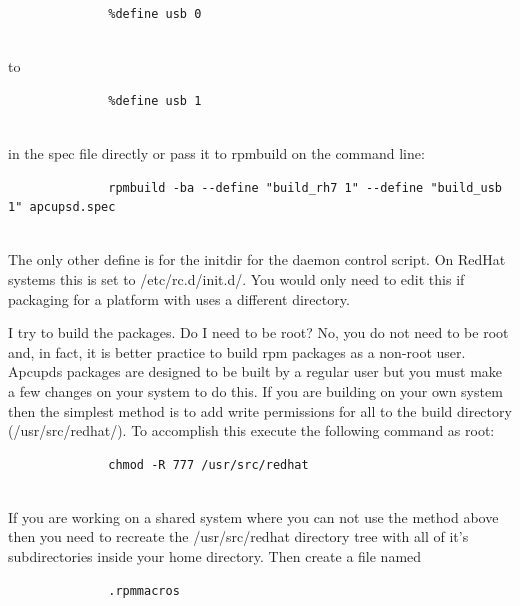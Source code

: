 {{{{{{{{{{{{{{{{{\begin{description}
\footnotesize
\begin{verbatim}
              %define usb 0
     
\end{verbatim}
\normalsize

to  

\footnotesize
\begin{verbatim}
              %define usb 1
     
\end{verbatim}
\normalsize

in the spec file directly or pass it to rpmbuild on the command line:  

\footnotesize
\begin{verbatim}
              rpmbuild -ba --define "build_rh7 1" --define "build_usb 1" apcupsd.spec
     
\end{verbatim}
\normalsize


\item [{\bf other defines are used?}]
   The only other define is for the initdir for the daemon control script. On
RedHat systems this is set to /etc/rc.d/init.d/.  You would only need to edit
this if packaging for a platform with uses a different directory.  

\item [{\bf I'm getting errors about not having permission when}]
   I try to build the packages.  Do I need to be root? No, you do not need to be
root and, in fact, it is better practice to build rpm packages as a non-root
user.  Apcupds packages are designed to be built by a regular user but you
must make a few changes on your system to do this.  If you are building on
your own system then the simplest method is to add write permissions for all
to the build directory (/usr/src/redhat/).  To accomplish this execute the
following command as root:  

\footnotesize
\begin{verbatim}
              chmod -R 777 /usr/src/redhat
     
\end{verbatim}
\normalsize

If you are working on a shared system where you can not use the method above
then you need to recreate the /usr/src/redhat directory tree with all of it's
subdirectories inside your home directory. Then create a file named  

\footnotesize
\begin{verbatim}
              .rpmmacros
     

\end{verbatim}
\end{description}}}}}}}}}}}}}}}}}}
